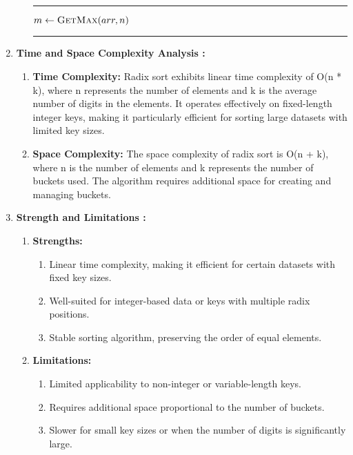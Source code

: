 \documentclass[conference]{IEEEtran}
\makeatletter
\newenvironment{breakablealgorithm}
  {%
     \refstepcounter{algorithm}%
     \hrule height.8pt depth0pt \kern2pt%
     \renewcommand{\caption}[2][\relax]{%
       {\raggedright\textbf{\fname@algorithm~\thealgorithm} ##2\par}%
       \ifx\relax##1\relax %
         \addcontentsline{loa}{algorithm}{\protect\numberline{\thealgorithm}##2}%
       \else %
         \addcontentsline{loa}{algorithm}{\protect\numberline{\thealgorithm}##1}%
       \fi
       \kern2pt\hrule\kern2pt
     }
  }{%
     \kern2pt\hrule\relax%
  }
\makeatother
\begin{document}
\begin{enumerate}
\begin{enumerate}
\begin{breakablealgorithm}
\begin{algorithmic}[1]
				\State $m \gets \Call{GetMax}{arr, n}$
					\State {}
				\EndFor
			\EndFunction
			
			
			\end{algorithmic}
			\end{breakablealgorithm}
	\end{enumerate}
	
	\item  \textbf{Time and Space Complexity Analysis : } \begin{enumerate}
		\item \textbf{Time Complexity:} Radix sort exhibits linear time complexity of O(n * k), where n represents the number of elements and k is the average number of digits in the elements. It operates effectively on fixed-length integer keys, making it particularly efficient for sorting large datasets with limited key sizes.
	    \item \textbf{Space Complexity:} The space complexity of radix sort is O(n + k), where n is the number of elements and k represents the number of buckets used. The algorithm requires additional space for creating and managing buckets.
	\end{enumerate}
	\item \textbf{Strength and Limitations : }
	      \begin{enumerate}
			\item \textbf{Strengths: }
			\begin{enumerate}
				\item Linear time complexity, making it efficient for certain datasets with fixed key sizes.
				\item Well-suited for integer-based data or keys with multiple radix positions.
				\item Stable sorting algorithm, preserving the order of equal elements.
			\end{enumerate}







			\item \textbf{Limitations: }
			\begin{enumerate}
				\item Limited applicability to non-integer or variable-length keys.
				\item Requires additional space proportional to the number of buckets.
				\item Slower for small key sizes or when the number of digits is significantly large.
			\end{enumerate}


\end{enumerate}
\end{enumerate}
\end{document}
